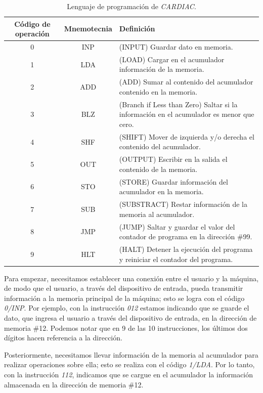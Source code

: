 \documentclass[letterpaper,12pt,oneside]{book}
\begin{document}
	
	\begin{table}[h]
	  \centering
	  \begin{tabular}{|c|c|p{8cm}|}
	    \hline
    	\textbf{Código de operación} & \textbf{Mnemotecnia} & \textbf{Definición} \\
	    \hline
	    0 & INP & (INPUT) Guardar dato en memoria.\\
	    \hline
		1 & LDA & (LOAD)  Cargar en el acumulador información de la memoria.\\
		\hline
	    2 & ADD & (ADD)  Sumar al contenido del acumulador contenido en la memoria.\\
	    \hline
	    3 & BLZ & (Branch if Less than Zero) Saltar si la información en el acumulador es menor que cero.\\
	    \hline
	    4 & SHF & (SHIFT) Mover de izquierda y/o derecha el contenido del acumulador.\\
	    \hline
	    5 & OUT & (OUTPUT) Escribir en la salida el contenido de la memoria.\\
	    \hline
	    6 & STO & (STORE) Guardar información del acumulador en la memoria.\\
	    \hline
	    7 & SUB & (SUBSTRACT) Restar información de la memoria al acumulador.\\
	    \hline
	    8 & JMP & (JUMP) Saltar y guardar el valor del contador de programa en la dirección \#99. \\
	    \hline
	    9 & HLT & (HALT) Detener la ejecución del programa y reiniciar el contador del programa.\\
	    \hline
	  \end{tabular}
	  \caption{Lenguaje de programación de \textit{CARDIAC}.}
	  \label{tab:simple-table}
	\end{table}
	
	Para empezar, necesitamos establecer una conexión entre el usuario y la máquina, de modo que el usuario, a través del dispositivo de entrada, pueda
	transmitir información a la memoria principal de la máquina; esto se logra con el código \textit{0/INP}. Por ejemplo, con la instrucción  	
	\textit{012} estamos indicando que se guarde el dato, que ingresa el usuario a través del dispositivo
	de entrada, en la dirección de memoria \#12. Podemos notar que en 9 de las 10 instrucciones, los últimos dos dígitos hacen referencia a la dirección.
 
	Posteriormente, necesitamos llevar información de la memoria al acumulador para realizar operaciones sobre ella; esto se realiza con el código 
	\textit{1/LDA}. Por lo tanto, con la instrucción
	\textit{112}, indicamos que se cargue en el acumulador la información almacenada en la dirección de memoria \#12.
 
\end{document}
